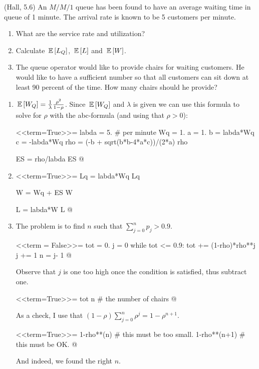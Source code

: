 \begin{question}(Hall, 5.6)
  An $M/M/1$ queue has been found to have an average waiting time in queue of 1 minute. The arrival rate is known to be 5 customers per minute.
  \begin{enumerate}
  \item What are the service rate and utilization?
  \item Calculate $\,\mathbb{E}\left[L_Q\right]$,  $\,\mathbb{E}\left[L\right]$ and $\,\mathbb{E}\left[W\right]$.
  \item The queue operator would like to provide chairs for waiting customers. He would like to have a sufficient number so that all customers can sit down at least 90 percent of the time. How many chairs should he provide?
  \end{enumerate}
  
    \begin{solution}
      \begin{enumerate}
      \item $\,\mathbb{E}\left[W_Q\right] = \frac{1}{\lambda}\frac{\rho^2}{1-\rho}$. Since
        $\,\mathbb{E}\left[W_Q\right]$ and $\lambda$ is given we can use this formula to
        solve for $\rho$ with the abc-formula (and using that
        $\rho > 0$):

<<term=True>>=
labda = 5. # per minute
Wq = 1.
a = 1.
b = labda*Wq
c = -labda*Wq
rho = (-b + sqrt(b*b-4*a*c))/(2*a)
rho 

ES = rho/labda
ES
@ 

\item 

<<term=True>>=
Lq = labda*Wq
Lq

W = Wq + ES
W

L = labda*W
L
@ 

\item 

The problem is to find $n$ such that
      $\sum_{j=0}^n p_j > 0.9$.

<<term = False>>=
tot = 0.
j = 0
while tot <= 0.9:
   tot += (1-rho)*rho**j
   j += 1
n = j- 1
@ 

Observe that $j$ is one too high once the condition is satisfied, thus subtract one.

<<term=True>>=
tot
n  # the number of chairs 
@      

As a check, I use that $(1-\rho) \sum_{j=0}^n \rho^j = 1-\rho^{n+1}$.

<<term=True>>=
1-rho**(n) #  this must be too small.
1-rho**(n+1) # this must be OK.
@ 

And indeed, we found the right $n$.

  \end{enumerate}

    \end{solution}
\end{question}

